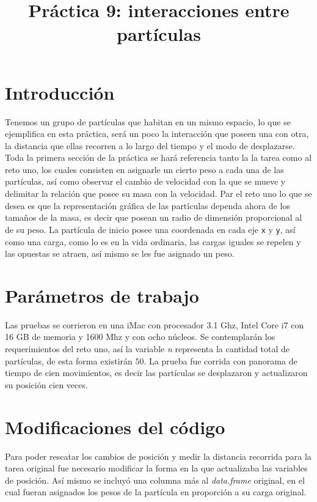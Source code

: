 \documentclass[a4paper]{article}
\title{Práctica 9: interacciones entre partículas}
\begin{document}
\maketitle

\section{Introducci\'on}
Tenemos un grupo de partículas que habitan en un mismo espacio, lo que se ejemplifica en esta práctica, será un poco la interacción que poseen una con otra, la distancia que ellas recorren a lo largo del tiempo y el modo de desplazarse. Toda la primera sección de la práctica se hará referencia tanto la la tarea como al reto uno, los cuales consisten en asignarle un cierto peso a cada una de las partículas, así como observar el cambio de velocidad con la que se mueve y delimitar la relación que posee su masa con la velocidad. Par el reto uno lo que se desea es que la representación gráfica de las partículas dependa ahora de los tamaños de la masa, es decir que posean un radio de dimensión proporcional al de su peso. La partícula de inicio posee una coordenada en cada eje \texttt{x} y \texttt{y}, así como una carga, como lo es en la vida ordinaria, las cargas iguales se repelen y las opuestas se atraen, así mismo se les fue asignado un peso.

\section{Par\'ametros de trabajo}
Las pruebas se corrieron en una iMac con procesador 3.1 Ghz, Intel Core i7 con 16 GB de memoria y 1600 Mhz y con ocho núcleos. Se contemplarán los requerimientos del reto uno, así la variable \textit{n} representa la cantidad total de partículas, de esta forma existirán $50$. La prueba fue corrida con panorama de tiempo de cien movimientos, es decir las partículas se desplazaron y actualizaron su posición cien veces.

\section{Modificaciones del código}
Para poder rescatar los cambios de posición y medir la distancia recorrida para la tarea original fue necesario modificar la forma en la que actualizaba las variables de posición. Así mismo se incluyó una columna más al \textit{data.frame} original, en el cual fueran asignados los pesos de la partícula en proporción a su carga original.
\end{document}
